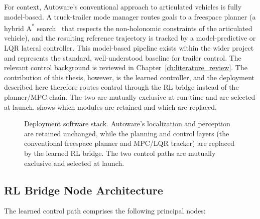 For context, Autoware's conventional approach to articulated vehicles is fully model-based. A truck-trailer mode manager routes goals to a freespace planner (a hybrid A\textsuperscript{*} search~\cite{dolgov2010hybridastar} that respects the non-holonomic constraints of the articulated vehicle), and the resulting reference trajectory is tracked by a model-predictive or LQR lateral controller. This model-based pipeline exists within the wider project and represents the standard, well-understood baseline for trailer control. The relevant control background is reviewed in Chapter~\ref{ch:literature_review}. The contribution of this thesis, however, is the learned controller, and the deployment described here therefore routes control through the RL bridge instead of the planner/MPC chain. The two are mutually exclusive at run time and are selected at launch.  shows which modules are retained and which are replaced.

\begin{figure}[t]
  \centering
  \resizebox{\textwidth}{!}{}
  \caption{Deployment software stack. Autoware's localization and perception are retained unchanged, while the planning and control layers (the conventional freespace planner and MPC/LQR tracker) are replaced by the learned RL bridge. The two control paths are mutually exclusive and selected at launch.}
  \label{fig:autoware_stack}
\end{figure}

\subsection{RL Bridge Node Architecture}

The learned control path comprises the following principal nodes:

